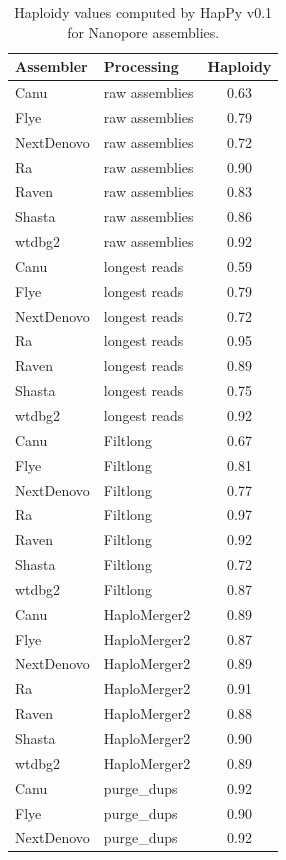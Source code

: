 \begin{table}[ht]
\centering
\caption{Haploidy values computed by HapPy v0.1 for Nanopore assemblies.}
\begin{adjustbox}{totalheight=\baselineskip}
\begin{tabular}{llc}
\hline
\textbf{Assembler} & \textbf{Processing} & \textbf{Haploidy} \\
\hline
Canu & raw assemblies & 0.63 \\
Flye & raw assemblies & 0.79 \\
NextDenovo & raw assemblies & 0.72 \\
Ra & raw assemblies & 0.90 \\
Raven & raw assemblies & 0.83 \\
Shasta & raw assemblies & 0.86 \\
wtdbg2 & raw assemblies & 0.92 \\
Canu & longest reads & 0.59 \\
Flye & longest reads & 0.79 \\
NextDenovo & longest reads & 0.72 \\
Ra & longest reads & 0.95 \\
Raven & longest reads & 0.89 \\
Shasta & longest reads & 0.75 \\
wtdbg2 & longest reads & 0.92 \\
Canu & Filtlong & 0.67 \\
Flye & Filtlong & 0.81 \\
NextDenovo & Filtlong & 0.77 \\
Ra & Filtlong & 0.97 \\
Raven & Filtlong & 0.92 \\
Shasta & Filtlong & 0.72 \\
wtdbg2 & Filtlong & 0.87 \\
Canu & HaploMerger2 & 0.89 \\
Flye & HaploMerger2 & 0.87 \\
NextDenovo & HaploMerger2 & 0.89 \\
Ra & HaploMerger2 & 0.91 \\
Raven & HaploMerger2 & 0.88 \\
Shasta & HaploMerger2 & 0.90 \\
wtdbg2 & HaploMerger2 & 0.89 \\
Canu & purge\_dups & 0.92 \\
Flye & purge\_dups & 0.90 \\
NextDenovo & purge\_dups & 0.92 \\

\end{tabular}
\end{adjustbox}
\end{table}
